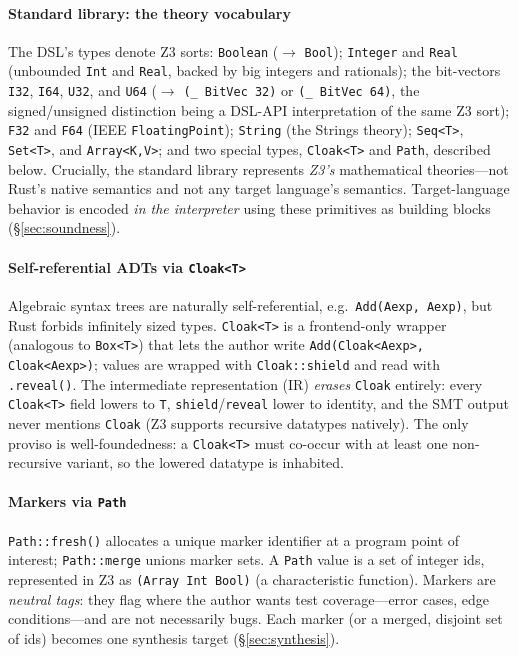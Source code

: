 \documentclass[sigplan,review,anonymous]{acmart}
\theoremstyle{definition}
\theoremstyle{remark}
\newcommand{\code}[1]{\texttt{#1}}
\begin{document}
\paragraph{Standard library: the theory vocabulary}
The DSL's types denote Z3 sorts: \code{Boolean} ($\to$ \code{Bool});
\code{Integer} and \code{Real} (unbounded \code{Int} and \code{Real}, backed by
big integers and rationals); the bit-vectors \code{I32}, \code{I64}, \code{U32},
and \code{U64} ($\to$ \code{(\_ BitVec 32)} or \code{(\_ BitVec 64)}, the
signed/unsigned distinction being a DSL-API interpretation of the same Z3 sort);
\code{F32} and \code{F64} (IEEE \code{FloatingPoint}); \code{String} (the Strings
theory); \code{Seq<T>}, \code{Set<T>}, and \code{Array<K,V>}; and two special
types, \code{Cloak<T>} and \code{Path}, described below. Crucially, the standard
library represents \emph{Z3's} mathematical theories---not Rust's native
semantics and not any target language's semantics. Target-language behavior is
encoded \emph{in the interpreter} using these primitives as building blocks
(\S\ref{sec:soundness}).

\paragraph{Self-referential ADTs via \code{Cloak<T>}}
Algebraic syntax trees are naturally self-referential, e.g.\ \code{Add(Aexp,
Aexp)}, but Rust forbids infinitely sized types. \code{Cloak<T>} is a
frontend-only wrapper (analogous to \code{Box<T>}) that lets the author write
\code{Add(Cloak<Aexp>, Cloak<Aexp>)}; values are wrapped with
\code{Cloak::shield} and read with \code{.reveal()}. The intermediate
representation (IR) \emph{erases} \code{Cloak} entirely: every \code{Cloak<T>}
field lowers to \code{T}, \code{shield}/\code{reveal} lower to identity, and the
SMT output never mentions \code{Cloak} (Z3 supports recursive datatypes
natively). The only proviso is well-foundedness: a \code{Cloak<T>} must co-occur
with at least one non-recursive variant, so the lowered datatype is inhabited.

\paragraph{Markers via \code{Path}}
\code{Path::fresh()} allocates a unique marker identifier at a program point of
interest; \code{Path::merge} unions marker sets. A \code{Path} value is a set of
integer ids, represented in Z3 as \code{(Array Int Bool)} (a characteristic
function). Markers are \emph{neutral tags}: they flag where the author wants test
coverage---error cases, edge conditions---and are not necessarily bugs. Each
marker (or a merged, disjoint set of ids) becomes one synthesis target
(\S\ref{sec:synthesis}).
\end{document}
